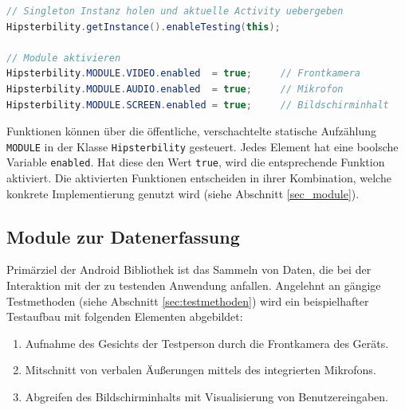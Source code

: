 \begin{lstlisting}[label=list_hipsterbility_client_init,language=Java, caption=Beispiel für Initialisierung der Android-Bibliothek]
// Singleton Instanz holen und aktuelle Activity uebergeben
Hipsterbility.getInstance().enableTesting(this);

// Module aktivieren
Hipsterbility.MODULE.VIDEO.enabled 	= true; 	// Frontkamera
Hipsterbility.MODULE.AUDIO.enabled 	= true;		// Mikrofon
Hipsterbility.MODULE.SCREEN.enabled = true;		// Bildschirminhalt
\end{lstlisting}

Funktionen können über die öffentliche, verschachtelte statische Aufzählung \texttt{MODULE} in der Klasse \texttt{Hipsterbility} gesteuert.
Jedes Element hat eine boolsche Variable \texttt{enabled}.
Hat diese den Wert \texttt{true}, wird die entsprechende Funktion aktiviert.
Die aktivierten Funktionen entscheiden in ihrer Kombination, welche konkrete Implementierung genutzt wird (siehe Abschnitt \ref{sec_module}).

\subsection{Module zur Datenerfassung \label{sec:module}}
Primärziel der Android Bibliothek ist das Sammeln von Daten, die bei der Interaktion mit der zu testenden Anwendung anfallen.
Angelehnt an gängige Testmethoden (siehe Abschnitt \ref{sec:testmethoden}) wird ein beispielhafter Testaufbau mit folgenden Elementen abgebildet:
\begin{enumerate}
	\item Aufnahme des Gesichts der Testperson durch die Frontkamera des Geräts.
	\item Mitschnitt von verbalen Äußerungen mittels des integrierten Mikrofons.
	\item Abgreifen des Bildschirminhalts mit Visualisierung von Benutzereingaben.
\end{enumerate}

